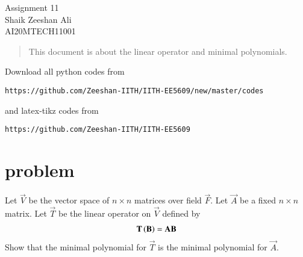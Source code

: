 \documentclass[journal,12pt]{IEEEtran}
\begin{document}
\renewcommand{\thefigure}{\theproblem}
\def\putbox#1#2#3{\makebox[0in][l]{\makebox[#1][l]{}\raisebox{\baselineskip}[0in][0in]{\raisebox{#2}[0in][0in]{#3}}}}
     \def\rightbox#1{\makebox[0in][r]{#1}}
     \def\centbox#1{\makebox[0in]{#1}}
     \def\topbox#1{\raisebox{-\baselineskip}[0in][0in]{#1}}
     \def\midbox#1{\raisebox{-0.5\baselineskip}[0in][0in]{#1}}
\vspace{3cm}
\begin{center}
\huge Assignment 11\\
\large Shaik Zeeshan Ali\\
\large AI20MTECH11001\\
\end{center}
\begin{abstract}
This document is about the linear operator and minimal polynomials.
\end{abstract}
Download all python codes from 
\begin{lstlisting}
https://github.com/Zeeshan-IITH/IITH-EE5609/new/master/codes
\end{lstlisting}
and latex-tikz codes from 
\begin{lstlisting}
https://github.com/Zeeshan-IITH/IITH-EE5609
\end{lstlisting}
\section{problem}
Let $\vec{V}$ be the vector space of $n\times n$ matrices over field $\vec{F}$. Let $\vec{A}$ be a fixed $n\times n$ matrix. Let $\vec{T}$ be the linear operator on $\vec{V}$ defined by
\begin{align}
    \mathbf{T\left(B\right)}=\mathbf{AB}
\end{align}
Show that the minimal polynomial for $\vec{T}$ is the minimal polynomial for $\vec{A}$.
\end{document}
